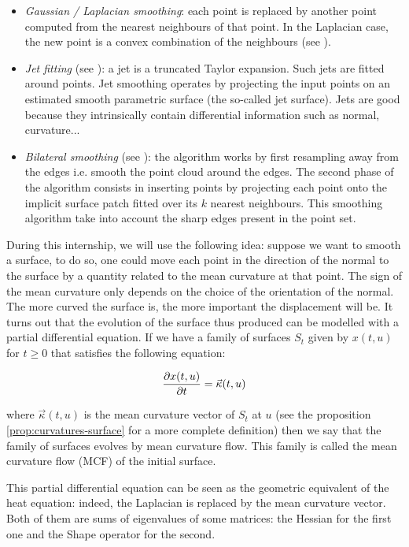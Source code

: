 \begin{itemize}
    \item \textit{Gaussian / Laplacian smoothing}: each point is replaced by
        another point computed from the nearest neighbours of that point. In
        the Laplacian case, the new point is a convex combination of the
        neighbours (see \cite{vollmer1999improved}).
    \item \textit{Jet fitting} (see \cite{cazals2005estimating}): a jet is a truncated
        Taylor expansion. Such jets are fitted around points. Jet smoothing
        operates by projecting the input points on an estimated smooth
        parametric surface (the so-called jet surface). Jets are good because
        they intrinsically contain differential information such as normal,
        curvature...
    \item \textit{Bilateral smoothing} (see \cite{huang2013edge}): the algorithm
        works by first resampling away from the edges i.e. smooth the point
        cloud around the edges. The second phase of the algorithm consists in
        inserting points by projecting each point onto the implicit surface
        patch fitted over its $ k $ nearest neighbours. This smoothing algorithm
        take into account the sharp edges present in the point set.
\end{itemize}

During this internship, we will use the following idea: suppose we want to
smooth a surface, to do so, one could move each point in the direction of the
normal to the surface by a quantity related to the mean curvature at that point.
The sign of the mean curvature only depends on the choice of the orientation of
the normal.  The more curved the surface is, the more important the displacement
will be. It turns out that the evolution of the surface thus produced can be
modelled with a partial differential equation. If we have a family of surfaces $
S_t $ given by $ x(t, u) $ for $ t \geq 0 $ that satisfies the following
equation:

$$ \frac{\partial{x(t, u)}}{\partial{t}} = \vec{\kappa}(t, u) $$

where $ \vec{\kappa}(t, u) $ is the mean curvature vector of $ S_t $ at $ u $
(see the proposition \ref{prop:curvatures-surface} for a more complete
definition) then we say that the family of surfaces evolves by
mean curvature flow. This family is called the mean curvature flow (MCF) of the
initial surface.

This partial differential equation can be seen as the geometric equivalent of
the heat equation: indeed, the Laplacian is replaced by the mean curvature
vector. Both of them are sums of eigenvalues of some matrices: the Hessian for
the first one and the Shape operator for the second.

